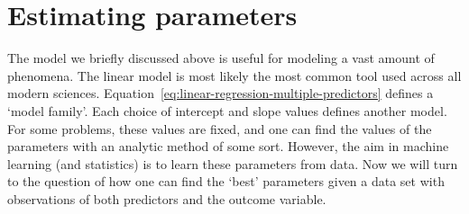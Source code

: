 \section{Estimating parameters}

The model we briefly discussed above is useful for modeling
a vast amount of phenomena.
The linear model is most likely the most common tool
used across all modern sciences.
Equation~\ref{eq:linear-regression-multiple-predictors}
defines a `model family'.
Each choice of intercept and slope values defines another model.
For some problems, these values are fixed,
and one can find the values of the parameters
with an analytic method of some sort.
However, the aim in machine learning (and statistics) is
to learn these parameters from data.
Now we will turn to the question of how one can find the `best'
parameters given a data set with
observations of both predictors and the outcome variable.

